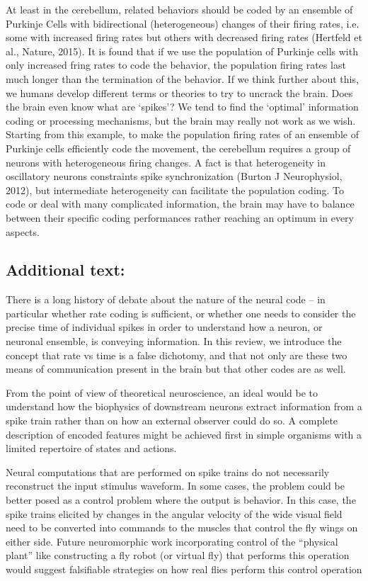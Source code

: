 \documentclass[12pt]{article}
\begin{document}
At least in the cerebellum, related behaviors should be coded by an ensemble of Purkinje Cells with bidirectional (heterogeneous) changes of their firing rates, i.e. some with
increased firing rates but others with decreased firing rates (Hertfeld et al., Nature, 2015). It is found that if we use the population of Purkinje cells with only increased
fring rates to code the behavior, the population firing rates last much longer than the termination of the behavior. If we think further about this, we humans develop
different terms or theories to try to uncrack the brain. Does the brain even know what are ‘spikes’? We tend to find the ‘optimal’ information coding or processing mechanisms,
but the brain may really not work as we wish. Starting from this example, to make the population firing rates of an ensemble of Purkinje cells efficiently code the movement,
the cerebellum requires a group of neurons with heterogeneous firing changes. A fact is that heterogeneity in oscillatory neurons constraints spike synchronization (Burton J
Neurophysiol, 2012), but intermediate heterogeneity can facilitate the population coding. To code or deal with many complicated information, the brain may have to balance
between their specific coding performances rather reaching an optimum in every aspects.

\subsection{Additional text:}

There is a long history of debate about the nature of the neural code -- in particular whether rate coding is sufficient, or whether one needs to consider the precise time of
individual spikes in order to understand how a neuron, or neuronal ensemble, is conveying information. In this review, we introduce the concept that rate vs time is a false
dichotomy, and that not only are these two means of communication present in the brain but that other codes are as well.

From the point of view of theoretical neuroscience, an ideal would be to understand how the biophysics of downstream neurons extract information from a spike train rather than
on how an external observer could do so. A complete description of encoded features might be achieved first in simple organisms with a limited repertoire of states and
actions.

Neural computations that are performed on spike trains do not necessarily reconstruct the input stimulus waveform. In some cases, the problem could be better posed as a
control problem where the output is behavior. In this case, the spike trains elicited by changes in the angular velocity of the wide visual field need to be converted into
commands to the muscles that control the fly wings on either side. Future neuromorphic work incorporating control of the “physical plant” like constructing a fly robot (or
virtual fly) that performs this operation would suggest falsifiable strategies on how real flies perform this control operation
\end{document}
